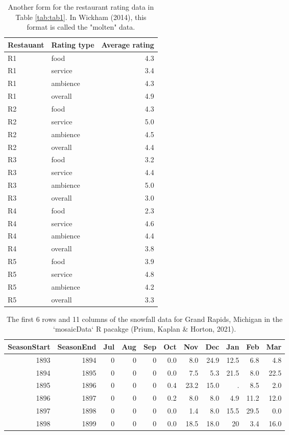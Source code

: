 \documentclass[10pt,a4paper,onecolumn]{article}
\begin{document}
\begin{table}

\caption{\label{tab:tab2}Another form for the restaurant rating data in Table \ref{tab:tab1}. In Wickham (2014), this format is called the "molten" data.}
\centering
\begin{tabular}[t]{llr}
\toprule
Restauant & Rating type & Average rating\\
\midrule
R1 & food & 4.3\\
R1 & service & 3.4\\
R1 & ambience & 4.3\\
R1 & overall & 4.9\\
R2 & food & 4.3\\
R2 & service & 5.0\\
R2 & ambience & 4.5\\
R2 & overall & 4.4\\
R3 & food & 3.2\\
R3 & service & 4.4\\
R3 & ambience & 5.0\\
R3 & overall & 3.0\\
R4 & food & 2.3\\
R4 & service & 4.6\\
R4 & ambience & 4.4\\
R4 & overall & 3.8\\
R5 & food & 3.9\\
R5 & service & 4.8\\
R5 & ambience & 4.2\\
R5 & overall & 3.3\\
\bottomrule
\end{tabular}
\end{table}

\begin{table}

\caption{\label{tab:tab3}The first 6 rows and 11 columns of the snowfall data for Grand Rapids, Michigan in the `mosaicData` R pacakge (Prium, Kaplan \& Horton, 2021).}
\centering
\begin{tabular}[t]{rrrrrrrrrrr}
\toprule
SeasonStart & SeasonEnd & Jul & Aug & Sep & Oct & Nov & Dec & Jan & Feb & Mar\\
\midrule
1893 & 1894 & 0 & 0 & 0 & 0.0 & 8.0 & 24.9 & 12.5 & 6.8 & 4.8\\
1894 & 1895 & 0 & 0 & 0 & 0.0 & 7.5 & 5.3 & 21.5 & 8.0 & 22.5\\
1895 & 1896 & 0 & 0 & 0 & 0.4 & 23.2 & 15.0 & . & 8.5 & 2.0\\
1896 & 1897 & 0 & 0 & 0 & 0.2 & 8.0 & 8.0 & 4.9 & 11.2 & 12.0\\
1897 & 1898 & 0 & 0 & 0 & 0.0 & 1.4 & 8.0 & 15.5 & 29.5 & 0.0\\
1898 & 1899 & 0 & 0 & 0 & 0.0 & 18.5 & 18.0 & 20 & 3.4 & 16.0\\
\bottomrule
\end{tabular}
\end{table}
\end{document}
